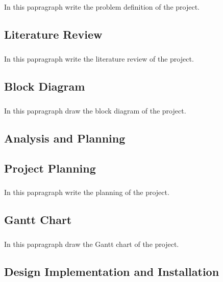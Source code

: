 \documentclass{book}
\begin{document}
\paragraph{}
In this papragraph write the problem definition of the project.

\section{Literature Review}
\paragraph{}
In this papragraph write the literature review of the project.

\section{Block Diagram}
\paragraph{}
In this papragraph draw the block diagram of the project.

\begin{doublespace} 
	\chapter{Analysis and Planning}
\end{doublespace}


\section{Project Planning}
\paragraph{}

In this papragraph write the planning of the project.


\section{Gantt Chart}
\paragraph{}

In this papragraph draw the Gantt chart of the project.

\begin{doublespace} 
	\chapter{Design Implementation and Installation}
\end{doublespace}
\end{document}
